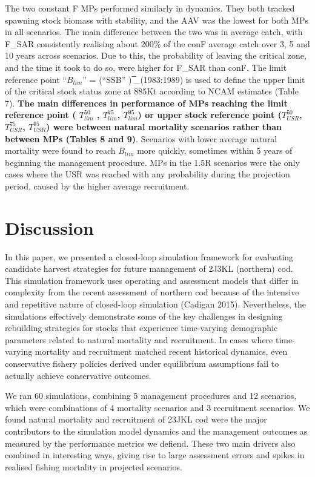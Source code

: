 \documentclass[12pt,]{article}
\begin{document}
The two constant F MPs performed similarly in dynamics. They both
tracked spawning stock biomass with stability, and the AAV was the
lowest for both MPs in all scenarios. The main difference between the
two was in average catch, with F\_SAR consistently realising about 200\%
of the conF average catch over 3, 5 and 10 years across scenarios. Due
to this, the probability of leaving the critical zone, and the time it
took to do so, were higher for F\_SAR than conF. The limit reference
point ``\(B_{lim}\)'' = (``SSB'' ) ̅\_(1983:1989) is used to define the
upper limit of the critical stock status zone at 885Kt according to NCAM
estimates (Table 7). \textbf{The main differences in performance of MPs
reaching the limit reference point ( \(T_{lim}^{50}\)⁡ ,
\(T_{lim}^{75}\), \(T_{lim}^{95}\)) or upper stock reference point
(\(T_{USR}^{50}\), \(T_{USR}^{75}\), \(T_{USR}^{95}\)) were between
natural mortality scenarios rather than between MPs (Tables 8 and 9)}.
Scenarios with lower average natural mortality were found to reach
\(B_{lim}\) more quickly, sometimes within 5 years of beginning the
management procedure. MPs in the 1.5R scenarios were the only cases
where the USR was reached with any probability during the projection
period, caused by the higher average recruitment.

\section{Discussion}\label{discussion}

In this paper, we presented a closed-loop simulation framework for
evaluating candidate harvest strategies for future management of 2J3KL
(northern) cod. This simulation framework uses operating and assessment
models that differ in complexity from the recent assessment of northern
cod because of the intensive and repetitive nature of closed-loop
simulation (Cadigan 2015). Nevertheless, the simulations effectively
demonstrate some of the key challenges in designing rebuilding
strategies for stocks that experience time-varying demographic
parameters related to natural mortality and recruitment. In cases where
time-varying mortality and recruitment matched recent historical
dynamics, even conservative fishery policies derived under equilibrium
assumptions fail to actually achieve conservative outcomes.

We ran 60 simulations, combining 5 management procedures and 12
scenarios, which were combinations of 4 mortality scenarios and 3
recruitment scenarios. We found natural mortality and recruitment of
23JKL cod were the major contributors to the simulation model dynamics
and the management outcomes as measured by the performance metrics we
defiend. These two main drivers also combined in interesting ways,
giving rise to large assessment errors and spikes in realised fishing
mortality in projected scenarios.
\end{document}
